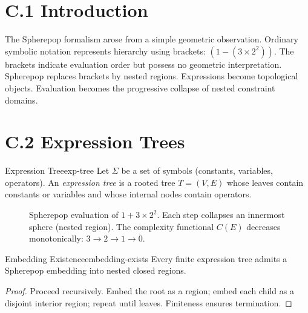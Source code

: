 
\section*{C.1 Introduction}

The Spherepop formalism arose from a simple geometric observation. Ordinary
symbolic notation represents hierarchy using brackets: $(1-(3\times 2^2))$.
The brackets indicate evaluation order but possess no geometric interpretation.
Spherepop replaces brackets by nested regions. Expressions become topological
objects. Evaluation becomes the progressive collapse of nested constraint domains.

\section*{C.2 Expression Trees}

\begin{definition}{Expression Tree}{exp-tree}
  Let $\Sigma$ be a set of symbols (constants, variables, operators). An
  \emph{expression tree} is a rooted tree $T = (V,E)$ whose leaves contain
  constants or variables and whose internal nodes contain operators.
\end{definition}

\begin{figure}[h]
  \centering
  \begin{tikzpicture}[scale=0.72]
    
  \end{tikzpicture}
  \caption{Spherepop evaluation of $1 + 3 \times 2^2$. Each step collapses
    an innermost sphere (nested region). The complexity functional $C(E)$
    decreases monotonically: $3 \to 2 \to 1 \to 0$.}
  \label{fig:spherepop-eval}
\end{figure}

\begin{proposition}{Embedding Existence}{embedding-exists}
  Every finite expression tree admits a Spherepop embedding into nested
  closed regions.
\end{proposition}

\begin{proof}
  Proceed recursively. Embed the root as a region; embed each child as a
  disjoint interior region; repeat until leaves. Finiteness ensures termination.
\end{proof}

